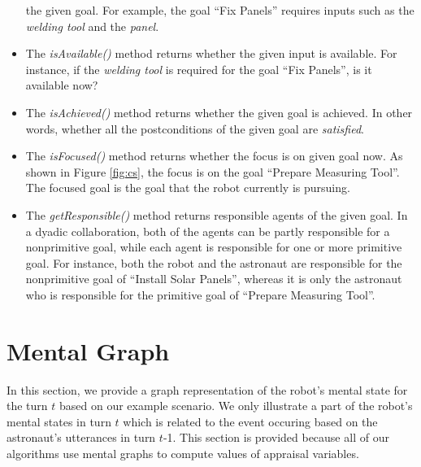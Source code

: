 \documentclass[letterpaper]{article}
\begin{document}
\begin{itemize}
  the given goal. For example, the goal ``Fix Panels'' requires inputs such as
  the \textit{welding tool} and the \textit{panel}.
  \item The \textit{isAvailable()} method returns whether the given input is
  available. For instance, if the \textit{welding tool} is required for the goal
  ``Fix Panels'', is it available now?
  \item The \textit{isAchieved()} method returns whether the given goal is
  achieved. In other words, whether all the postconditions of the given goal are
  \textit{satisfied}.
  \item The \textit{isFocused()} method returns whether the focus is on given
  goal now. As shown in Figure \ref{fig:cs}, the focus is on the goal ``Prepare
  Measuring Tool''. The focused goal is the goal that the robot currently is
  pursuing.
  \item The \textit{getResponsible()} method returns responsible agents of the
  given goal. In a dyadic collaboration, both of the agents can be partly
  responsible for a nonprimitive goal, while each agent is responsible for one
  or more primitive goal. For instance, both the robot and the astronaut are
  responsible for the nonprimitive goal of ``Install Solar Panels'', whereas
  it is only the astronaut who is responsible for the primitive goal of
  ``Prepare Measuring Tool''.
\end{itemize}

\section{Mental Graph}
\label{sec:mental-graph}

In this section, we provide a graph representation of the robot's mental state
for the turn $t$ based on our example scenario. We only illustrate a part of the
robot's mental states in turn $t$ which is related to the event occuring based
on the astronaut's utterances in turn $t$-1. This section is provided because
all of our algorithms use mental graphs to compute values of appraisal
variables.
\end{document}
